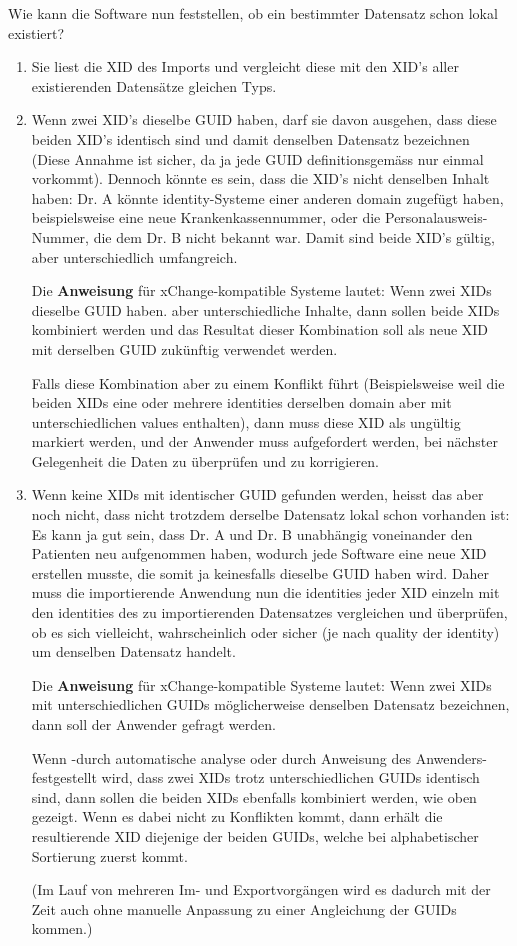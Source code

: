 \documentclass[a4paper]{scrartcl}
\begin{document}
Wie kann die Software nun feststellen, ob ein bestimmter Datensatz schon lokal existiert?
\begin{enumerate}
\item Sie liest die XID des Imports und vergleicht diese mit den XID's aller existierenden Datensätze gleichen Typs.
\item Wenn zwei XID's dieselbe GUID haben, darf sie davon ausgehen, dass diese beiden XID's identisch sind und damit denselben Datensatz bezeichnen (Diese Annahme ist sicher, da ja jede GUID definitionsgemäss nur einmal vorkommt). Dennoch könnte es sein, dass die XID's nicht denselben Inhalt haben: Dr. A könnte identity-Systeme einer anderen domain zugefügt haben, beispielsweise eine neue Krankenkassennummer, oder die Personalausweis-Nummer, die dem Dr. B nicht bekannt war. Damit sind beide XID's gültig, aber unterschiedlich umfangreich.

    Die \textbf{Anweisung} für xChange-kompatible Systeme lautet: Wenn zwei XIDs dieselbe GUID haben. aber unterschiedliche Inhalte, dann sollen beide XIDs kombiniert werden und das Resultat dieser Kombination soll als neue XID mit derselben GUID zukünftig verwendet werden.

    Falls diese Kombination aber zu einem Konflikt führt (Beispielsweise weil die beiden XIDs eine oder mehrere identities derselben domain aber mit unterschiedlichen values enthalten), dann muss diese XID als ungültig markiert werden, und der Anwender muss aufgefordert werden, bei nächster Gelegenheit die Daten zu überprüfen und zu korrigieren.

\item Wenn keine XIDs mit identischer GUID gefunden werden, heisst das aber noch nicht, dass nicht trotzdem derselbe Datensatz lokal schon vorhanden ist: Es kann ja gut sein, dass Dr. A und Dr. B unabhängig voneinander den Patienten neu aufgenommen haben, wodurch jede Software eine neue XID erstellen musste, die somit ja keinesfalls dieselbe GUID haben wird.
    Daher muss die importierende Anwendung nun die identities jeder XID einzeln mit den identities des zu importierenden Datensatzes vergleichen und überprüfen, ob es sich vielleicht, wahrscheinlich oder sicher (je nach quality der identity) um denselben Datensatz handelt.

    Die \textbf{Anweisung} für xChange-kompatible Systeme lautet: Wenn zwei XIDs mit unterschiedlichen GUIDs möglicherweise denselben Datensatz bezeichnen, dann soll der Anwender gefragt werden.

    Wenn -durch automatische analyse oder durch Anweisung des Anwenders- festgestellt wird, dass zwei XIDs trotz unterschiedlichen GUIDs identisch sind, dann sollen die beiden XIDs ebenfalls kombiniert werden, wie oben gezeigt. Wenn es dabei nicht zu Konflikten kommt, dann erhält die resultierende XID diejenige der beiden GUIDs, welche bei alphabetischer Sortierung zuerst kommt.

    (Im Lauf von mehreren Im- und Exportvorgängen wird es dadurch mit der Zeit auch ohne manuelle Anpassung zu einer Angleichung der GUIDs kommen.)

\end{enumerate}
\end{document}

